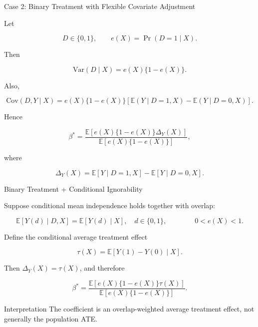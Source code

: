 \documentclass[aspectratio=169,11pt]{beamer}
\begin{document}
\begin{frame}{Case 2: Binary Treatment with Flexible Covariate Adjustment}
\small

Let

\[
D\in\{0,1\},
\qquad
e(X)=\Pr(D=1\mid X).
\]

Then

\[
\mathrm{Var}(D\mid X)
=
e(X)\{1-e(X)\}.
\]

Also,

\[
\mathrm{Cov}(D,Y\mid X)
=
e(X)\{1-e(X)\}
\left[
\mathbb{E}(Y\mid D=1,X)
-
\mathbb{E}(Y\mid D=0,X)
\right].
\]

Hence

\[
\boxed{
\beta^*
=
\frac{
\mathbb{E}
\left[
e(X)\{1-e(X)\}
\Delta_Y(X)
\right]
}{
\mathbb{E}
\left[
e(X)\{1-e(X)\}
\right]
},
}
\]

where

\[
\Delta_Y(X)
=
\mathbb{E}[Y\mid D=1,X]
-
\mathbb{E}[Y\mid D=0,X].
\]

\end{frame}


\begin{frame}{Binary Treatment + Conditional Ignorability}
\small

Suppose conditional mean independence holds together with overlap:

\[
\mathbb{E}[Y(d)\mid D,X]
=
\mathbb{E}[Y(d)\mid X],
\quad d\in\{0,1\},
\qquad\qquad
0<e(X)<1.
\]

Define the conditional average treatment effect

\[
\tau(X)
=
\mathbb{E}[Y(1)-Y(0)\mid X].
\]

Then \(\Delta_Y(X)=\tau(X)\), and therefore

\[
\boxed{
\beta^*
=
\frac{
\mathbb{E}
\left[
e(X)\{1-e(X)\}\tau(X)
\right]
}{
\mathbb{E}
\left[
e(X)\{1-e(X)\}
\right]
}.
}
\]

\begin{block}{Interpretation}
The coefficient is an
\alert{overlap-weighted average treatment effect},
not generally the population ATE.
\end{block}

\end{frame}
\end{document}
